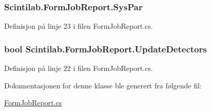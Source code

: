 \hypertarget{class_scintilab_1_1_form_job_report_a9d69b66d54f46318d0cd060dd22ef920}{
\subsubsection[{Sys\+Par}]{ Scintilab.\+Form\+Job\+Report.\+Sys\+Par\hspace{0.3cm}{\ttfamily [private]}}}\label{class_scintilab_1_1_form_job_report_a9d69b66d54f46318d0cd060dd22ef920}


Definisjon på linje 23 i filen Form\+Job\+Report.\+cs.

\hypertarget{class_scintilab_1_1_form_job_report_a03fca1552c0a65c4e526318e880941ff}{
\subsubsection[{Update\+Detectors}]{\setlength{\rightskip}{0pt plus 5cm}bool Scintilab.\+Form\+Job\+Report.\+Update\+Detectors}}\label{class_scintilab_1_1_form_job_report_a03fca1552c0a65c4e526318e880941ff}


Definisjon på linje 22 i filen Form\+Job\+Report.\+cs.



Dokumentasjonen for denne klasse ble generert fra følgende fil\+:\begin{DoxyCompactItemize}
\item 
\hyperlink{_form_job_report_8cs}{Form\+Job\+Report.\+cs}\end{DoxyCompactItemize}
